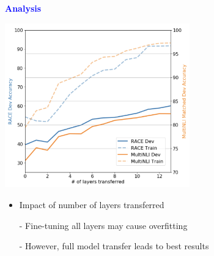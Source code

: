 \documentclass[professionalfont]{beamer}
\begin{document}
\begin{frame}

\begin{center}
    { \textbf{\textcolor{blue}{ {\fontsize{12}{14}\selectfont Analysis} }} }
\end{center}

\begin{center}
    \includegraphics[width=0.6\textwidth]{figure/2-1.png}
\end{center}

{\fontsize{10}{14}\selectfont 
\begin{itemize}
    \item Impact of number of layers transferred

    - Fine-tuning all layers may cause overfitting

    - However, full model transfer leads to best results

\end{itemize}
}

\end{frame}
\end{document}
